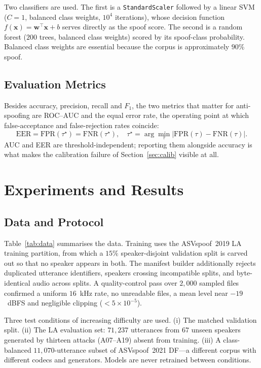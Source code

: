 \documentclass[journal,10pt]{IEEEtran}
\begin{document}
Two classifiers are used. The first is a \texttt{StandardScaler} followed by
a linear SVM ($C = 1$, balanced class weights, $10^{4}$ iterations), whose
decision function $f(\mathbf{x}) = \mathbf{w}^{\top}\mathbf{x} + b$ serves
directly as the spoof score. The second is a random forest ($200$ trees,
balanced class weights) scored by its spoof-class probability. Balanced
class weights are essential because the corpus is approximately $90\%$
spoof.

\subsection{Evaluation Metrics}
Besides accuracy, precision, recall and $F_1$, the two metrics that matter
for anti-spoofing are ROC--AUC and the equal error rate, the operating point
at which false-acceptance and false-rejection rates coincide:
\begin{equation}
\mathrm{EER} = \mathrm{FPR}(\tau^\star) = \mathrm{FNR}(\tau^\star), \quad
\tau^\star = \arg\min_{\tau} \bigl|\mathrm{FPR}(\tau) - \mathrm{FNR}(\tau)\bigr| .
\end{equation}
AUC and EER are threshold-independent; reporting them alongside accuracy is
what makes the calibration failure of Section~\ref{sec:calib} visible at all.

\section{Experiments and Results}
\label{sec:results}

\subsection{Data and Protocol}
Table~\ref{tab:data} summarises the data. Training uses the ASVspoof~2019 LA
training partition, from which a $15\%$ speaker-disjoint validation split is
carved out so that no speaker appears in both. The manifest builder
additionally rejects duplicated utterance identifiers, speakers crossing
incompatible splits, and byte-identical audio across splits. A
quality-control pass over $2{,}000$ sampled files confirmed a uniform
$16$~kHz rate, no unreadable files, a mean level near $-19$~dBFS and
negligible clipping ($<5 \times 10^{-5}$).

Three test conditions of increasing difficulty are used. (i) The matched
validation split. (ii) The LA evaluation set: $71{,}237$ utterances from
$67$ unseen speakers generated by thirteen attacks (A07--A19) absent from
training. (iii) A class-balanced $11{,}070$-utterance subset of
ASVspoof~2021 DF---a different corpus with different codecs and generators.
Models are never retrained between conditions.
\end{document}

